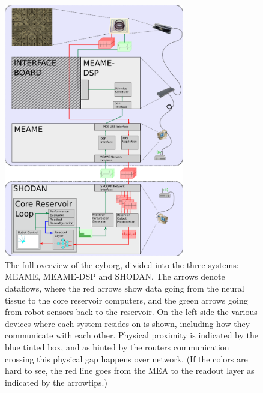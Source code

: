 \begin{figure}[h!]
  \centering
  \includegraphics[width=0.7\textwidth]{fig/system3.png}
  \caption[Block diagram overview of the cyborg]{
    The full overview of the cyborg, divided into the three systems: MEAME,
    MEAME-DSP and SHODAN.
    The arrows denote dataflows, where the red arrows show data going from the
    neural tissue to the core reservoir computers, and the green arrows going
    from robot sensors back to the reservoir.
    On the left side the various devices where each system resides on is shown,
    including how they communicate with each other.
    Physical proximity is indicated by the blue tinted box, and as hinted by the
    routers communication crossing this physical gap happens over network.
    (If the colors are hard to see, the red line goes from the MEA to the
    readout layer as indicated by the arrowtips.)
  }
  \label{figOverview}
\end{figure}
%
\clearpage
